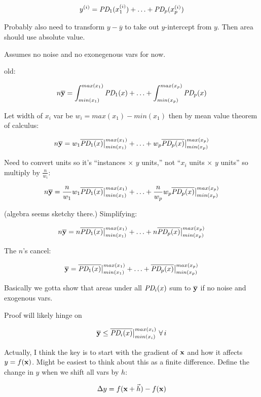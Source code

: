 \documentclass[12pt]{article}
\begin{document}
\[
y^{(i)} = \text{\it PD}_1(x_1^{(i)}) + \ldots + \text{\it PD}_p(x_p^{(i)})
\]

\noindent Probably also need to transform $y - \overline{y}$ to take out $y$-intercept from $y$.  Then area should use absolute value.

Assumes no noise and no exonegenous vars for now.

old:

\[
n \overline {\bf y} = \int_{min(x_1)}^{max(x_1)} \text{\it PD}_1(x) + \ldots + \int_{min(x_p)}^{max(x_p)} \text{\it PD}_p(x)
\]

Let width of $x_i$ var be $w_i = max(x_1)-min(x_1)$ then by mean value theorem of calculus:

\[
n \overline {\bf y} = w_1\overline{\text{\it PD}_1(x)}\big |_{min(x_1)}^{max(x_1)} + \ldots + w_p\overline{\text{\it PD}_p(x)}\big |_{min(x_p)}^{max(x_p)}
\]

Need to convert units so it's ``instances $\times$ $y$ units,'' not ``$x_i$ units $\times$ $y$ units'' so multiply by $\frac{n}{w_i}$:

\[
n \overline {\bf y} = \frac{n}{w_1} w_1\overline{\text{\it PD}_1(x)}\big |_{min(x_1)}^{max(x_1)} + \ldots + \frac{n}{w_p} w_p\overline{\text{\it PD}_p(x)}\big |_{min(x_p)}^{max(x_p)}
\]

(algebra seems sketchy there.) Simplifying:

\[
n \overline {\bf y} = n\overline{\text{\it PD}_1(x)}\big |_{min(x_1)}^{max(x_1)} + \ldots + n \overline{\text{\it PD}_p(x)}\big |_{min(x_p)}^{max(x_p)}
\]

The $n$'s cancel:

\[
\overline {\bf y} = \overline{\text{\it PD}_1(x)}\big |_{min(x_1)}^{max(x_1)} + \ldots + \overline{\text{\it PD}_p(x)}\big |_{min(x_p)}^{max(x_p)}
\]

Basically we gotta show that areas under all $\text{\it PD}_i(x)$ sum to $\overline{\bf y}$ if no noise and exogenous vars.

Proof will likely hinge on

\[
\overline {\bf y} \le \overline{\text{\it PD}_i(x)}\big |_{min(x_i)}^{max(x_i)} ~\forall\, i
\]

Actually, I think the key is to start with the gradient of ${\bf x}$ and how it affects $y=f({\bf x})$. Might be easiest to think about this as a finite difference. Define the change in $y$ when we shift all vars by $h$:

\[
\Delta y = f({\bf x} + \vec{h}) - f({\bf x})
\]
\end{document}
